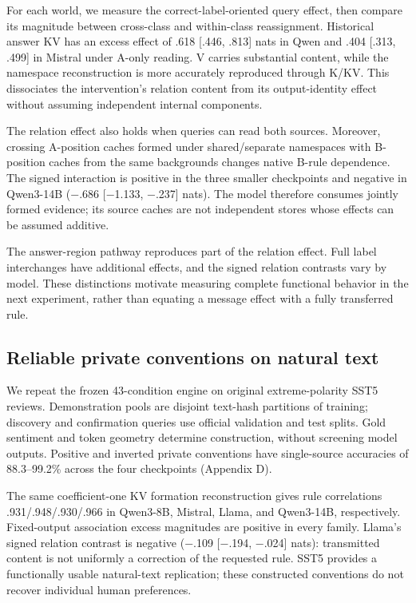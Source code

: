 \documentclass[11pt]{article}
\begin{document}
For each world, we measure the correct-label-oriented query effect, then compare its magnitude between cross-class and within-class reassignment. Historical answer KV has an excess effect of .618 {[}.446, .813{]} nats in Qwen and .404 {[}.313, .499{]} in Mistral under A-only reading. V carries substantial content, while the namespace reconstruction is more accurately reproduced through K/KV. This dissociates the intervention's relation content from its output-identity effect without assuming independent internal components.

The relation effect also holds when queries can read both sources. Moreover, crossing A-position caches formed under shared/separate namespaces with B-position caches from the same backgrounds changes native B-rule dependence. The signed interaction is positive in the three smaller checkpoints and negative in Qwen3-14B (−.686 {[}−1.133, −.237{]} nats). The model therefore consumes jointly formed evidence; its source caches are not independent stores whose effects can be assumed additive.

The answer-region pathway reproduces part of the relation effect. Full label interchanges have additional effects, and the signed relation contrasts vary by model. These distinctions motivate measuring complete functional behavior in the next experiment, rather than equating a message effect with a fully transferred rule.

\subsection{Reliable private conventions on natural text}\label{reliable-private-conventions-on-natural-text}

We repeat the frozen 43-condition engine on original extreme-polarity SST5 reviews. Demonstration pools are disjoint text-hash partitions of training; discovery and confirmation queries use official validation and test splits. Gold sentiment and token geometry determine construction, without screening model outputs. Positive and inverted private conventions have single-source accuracies of 88.3--99.2\% across the four checkpoints (Appendix D).

The same coefficient-one KV formation reconstruction gives rule correlations .931/.948/.930/.966 in Qwen3-8B, Mistral, Llama, and Qwen3-14B, respectively. Fixed-output association excess magnitudes are positive in every family. Llama's signed relation contrast is negative (−.109 {[}−.194, −.024{]} nats): transmitted content is not uniformly a correction of the requested rule. SST5 provides a functionally usable natural-text replication; these constructed conventions do not recover individual human preferences.
\end{document}
